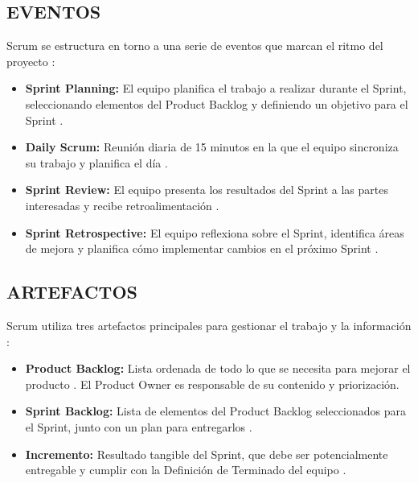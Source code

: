 \subsection{EVENTOS}

Scrum se estructura en torno a una serie de eventos que marcan el ritmo del proyecto \autocite{schwaber2020guia}:

\begin{itemize}
    \item \textbf{Sprint Planning:} El equipo planifica el trabajo a realizar durante el Sprint, seleccionando elementos del Product Backlog y definiendo un objetivo para el Sprint \autocite{rubin2012essential}.
    \item \textbf{Daily Scrum:} Reunión diaria de 15 minutos en la que el equipo sincroniza su trabajo y planifica el día \autocite{schwaber2020guia}.
    \item \textbf{Sprint Review:} El equipo presenta los resultados del Sprint a las partes interesadas y recibe retroalimentación \autocite{rubin2012essential}.
    \item \textbf{Sprint Retrospective:} El equipo reflexiona sobre el Sprint, identifica áreas de mejora y planifica cómo implementar cambios en el próximo Sprint \autocite{schwaber2020guia}.
\end{itemize}

\subsection{ARTEFACTOS}

Scrum utiliza tres artefactos principales para gestionar el trabajo y la información \autocite{schwaber2020guia}:

\begin{itemize}
    \item \textbf{Product Backlog:} Lista ordenada de todo lo que se necesita para mejorar el producto \autocite{cohn2010suceeding}. El Product Owner es responsable de su contenido y priorización.
    \item \textbf{Sprint Backlog:} Lista de elementos del Product Backlog seleccionados para el Sprint, junto con un plan para entregarlos \autocite{rubin2012essential}.
    \item \textbf{Incremento:} Resultado tangible del Sprint, que debe ser potencialmente entregable y cumplir con la Definición de Terminado del equipo \autocite{schwaber2020guia}.
\end{itemize}


